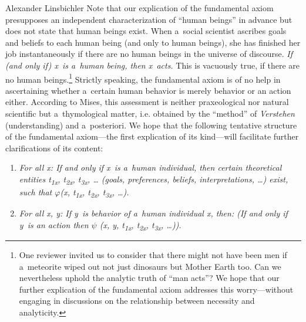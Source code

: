 \begin{artengenv}{Alexander Linsbichler}
Note that our explication of the fundamental axiom presupposes an independent characterization of ``human beings'' in advance but does not state that human beings exist. When a~social scientist ascribes goals and beliefs to each human being (and only to human beings), she has finished her job instantaneously if there are no human beings in the universe of discourse. \textit{If (and only if) x~is a~human being, then x~acts.} This is vacuously true, if there are no human beings.\footnote{One reviewer invited us to consider that there might not have been men if a~meteorite wiped out not just dinosaurs but Mother Earth too. Can we nevertheless uphold the analytic truth of ``man acts''? We hope that our further explication of the fundamental axiom addresses this worry---without engaging in discussions on the relationship between necessity and analyticity.} Strictly speaking, the fundamental axiom is of no help in ascertaining whether a~certain human behavior is merely behavior or an action either. According to Mises, this assessment is neither praxeological nor natural scientific but a~thymological matter, i.e. obtained by the ``method'' of \textit{Verstehen} (understanding) and a~posteriori. We hope that the following tentative structure of the fundamental axiom---the first explication of its kind---will facilitate further clarifications of its content:



\begin{enumerate}[label=\alph*)]
\item \textit{For all x: If and only if x~is a~human individual, then certain theoretical entities t}\textit{\textsubscript{1x}}\textit{, t}\textit{\textsubscript{2x}}\textit{, t}\textit{\textsubscript{3x}}\textit{, … (goals, preferences, beliefs, interpretations, …) exist, such that $\varphi $(x, t}\textit{\textsubscript{1x}}\textit{, t}\textit{\textsubscript{2x}}\textit{, t}\textit{\textsubscript{3x}}\textit{, …).}
\item \textit{For all x, y: If y~is behavior of a~human individual x, then: (If and only if y~is an action then $\psi $ (x, y, t}\textit{\textsubscript{1x}}\textit{, t}\textit{\textsubscript{2x}}\textit{, t}\textit{\textsubscript{3x}}\textit{, …)).}
\end{enumerate}


\end{artengenv}
